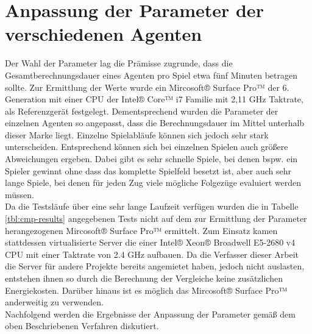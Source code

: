 \section{Anpassung der Parameter der verschiedenen Agenten}
\authorpatrick
Der Wahl der Parameter lag die Prämisse zugrunde, dass die Gesamtberechnungsdauer eines Agenten pro Spiel etwa fünf Minuten betragen sollte. Zur Ermittlung der Werte wurde ein  Mircosoft® Surface Pro™ der 6. Generation mit einer CPU der Intel® Core™ i7 Familie mit 2,11 GHz Taktrate, als Referenzgerät festgelegt. Dementsprechend wurden die Parameter der einzelnen Agenten so angepasst, dass die Berechnungsdauer im Mittel unterhalb dieser Marke liegt. Einzelne Spielabläufe können sich jedoch sehr stark unterscheiden. Entsprechend können sich bei einzelnen Spielen auch größere Abweichungen ergeben. Dabei gibt es sehr schnelle Spiele, bei denen bspw. ein Spieler gewinnt ohne dass das komplette Spielfeld besetzt ist, aber auch sehr lange Spiele, bei denen für jeden Zug viele mögliche Folgezüge evaluiert werden müssen.
\\Da die Testsläufe über eine sehr lange Laufzeit verfügen wurden die in Tabelle \ref{tbl:cmp-results} angegebenen Tests nicht auf dem zur Ermittlung der Parameter herangezogenen Mircosoft® Surface Pro™ ermittelt. Zum Einsatz kamen stattdessen virtualisierte Server die einer Intel® Xeon® Broadwell E5-2680 v4 CPU mit einer Taktrate von 2.4 GHz aufbauen. Da die Verfasser dieser Arbeit die Server für andere Projekte bereits angemietet haben, jedoch nicht auslasten, entstehen ihnen so durch die Berechnung der Vergleiche keine zusätzlichen Energiekosten. Darüber hinaus ist es möglich das Mircosoft® Surface Pro™ anderweitig zu verwenden.
\\Nachfolgend werden die Ergebnisse der Anpassung der Parameter gemäß dem oben Beschriebenen Verfahren diskutiert.

